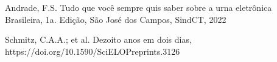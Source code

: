 \documentclass[
12pt,		%
openright,	%
twoside,  %
a4paper,			%
chapter=TITLE,		%
english,			%
french,				%
spanish,			%
brazil				%
]{USPSC-classe/USPSC}
\begin{document}
\begin{flushleft}
\begin{flushleft}
\begin{flushleft}
\begin{flushleft}
\begin{flushleft}
\begin{flushleft}
\begin{flushleft}
\begin{flushleft}
\begin{flushleft}
\begin{flushleft}
[ANDRADE, 2022] Andrade, F.S. Tudo que voc\^e sempre quis saber sobre a urna eletr\^onica Brasileira, 1a. Edi\c{c}\~ao, S\~ao Jos\'e dos Campos, SindCT, 2022
\end{flushleft}


\end{flushleft}


\end{flushleft}


\end{flushleft}


\end{flushleft}


\end{flushleft}


\end{flushleft}


\end{flushleft}


\end{flushleft}


\end{flushleft}


\begin{flushleft}
\begin{flushleft}
\begin{flushleft}
\begin{flushleft}
\begin{flushleft}
\begin{flushleft}
\begin{flushleft}
\begin{flushleft}
\begin{flushleft}
\begin{flushleft}
[Schmitz et al., 2021] Schmitz, C.A.A.; et al. Dezoito anos em dois dias, https://doi.org/10.1590/SciELOPreprints.3126
\end{flushleft}


\end{flushleft}


\end{flushleft}


\end{flushleft}


\end{flushleft}


\end{flushleft}


\end{flushleft}


\end{flushleft}


\end{flushleft}


\end{flushleft}
\end{document}

